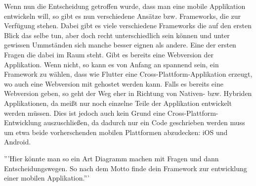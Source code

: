 Wenn nun die Entscheidung getroffen wurde, dass man eine mobile Applikation entwickeln will, so gibt es nun verschiedene Ansätze bzw. Frameworks, die zur Verfügung stehen. Dabei gibt es viele verschiedene Frameworks die auf den ersten Blick das selbe tun, aber doch recht unterschiedlich sein können und unter gewissen Ummständen sich manche besser eignen als andere. 
Eine der ersten Fragen die dabei im Raum steht. Gibt es bereits eine Webversion der Applikation.
Wenn nicht, so kann es von Anfang an spannend sein, ein Framework zu wählen, dass wie Flutter eine Cross-Plattform-Applikation erzeugt, wo auch eine Webversion mit gehostet werden kann.
Falls es bereits eine Webversion geben, so geht der Weg eher in Richtung von Nativen- bzw. Hybriden Applikationen, da meißt nur noch einzelne Teile der Applikation entwickelt werden müssen. Dies ist jedoch auch kein Grund eine Cross-Plattform-Entwicklung auszuschließen, da dadurch nur ein Code geschrieben werden muss um etwa beide vorherschenden mobilen Plattformen abzudecken: iOS und Android.

'''Hier könnte man so ein Art Diagramm machen mit Fragen und dann Entscheidungswegen. So nach dem Motto finde dein Framework zur entwicklung einer mobilen Applikation.'''
